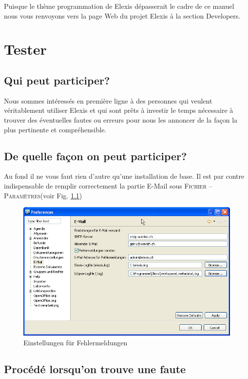 Puisque le thème \glqq programmation de Elexis\grqq{} dépasserait le cadre de ce manuel nous vous renvoyons vers la page Web du projet Elexis à la section \glqq Developers\grqq{}.

\chapter{Tester}
\section{Qui peut participer? }
Nous sommes intéressés en première ligne à des personnes qui veulent \glqq véritablement\grqq{} utiliser Elexis et qui sont  prêts à investir le temps nécessaire à trouver des éventuelles fautes ou erreurs pour nous les annoncer de la façon la plus pertinente et compréhensible.
\section{De quelle façon on peut participer?}
\label{senderrors}
Au fond il ne vous faut rien d'autre qu'une installation de base. Il est par contre indispensable de remplir correctement la partie \glqq E-Mail\grqq{} sous \textsc{Fichier -- Paramètres}(voir Fig. \ref{fig:mailsettings})
\begin{figure}[htp]
\begin{center}
  \includegraphics[width=150mm]{images/mailsettings}
  \caption{Einstellungen für Fehlermeldungen}
  \label{fig:mailsettings}
\end{center}
\end{figure}
\section{Procédé lorsqu'on trouve une faute}

